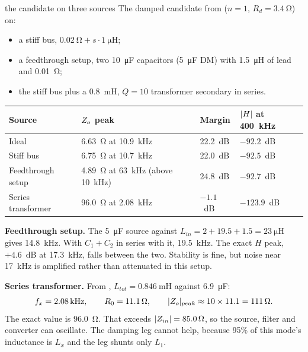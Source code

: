 \begin{examplebox}[label=ex:sources]{the candidate on three sources}
	The damped candidate from  ($n = 1$,
	$R_d = \qty{3.4}{\ohm}$) on:
	\begin{itemize}
		\item a stiff bus, $\qty{0.02}{\ohm} + s\cdot\qty{1}{\micro\henry}$;
		\item a feedthrough setup, two \qty{10}{\micro\farad} capacitors
		      (\qty{5}{\micro\farad} DM) with \qty{1.5}{\micro\henry} of lead
		      and \qty{0.01}{\ohm};
		\item the stiff bus plus a \qty{0.8}{\milli\henry}, $Q = 10$ transformer
		      secondary in series.
	\end{itemize}

	\begin{center}
		\small
		\begin{tabular}{@{}llll@{}}
			\toprule
			Source              & $Z_o$ peak                                    & Margin   & $\lvert H\rvert$ at \qty{400}{\kHz} \\
			\midrule
			Ideal               & \qty{6.63}{\ohm} at \qty{10.9}{\kHz}          & 22.2~dB  & $-92.2$~dB                   \\
			Stiff bus           & \qty{6.75}{\ohm} at \qty{10.7}{\kHz}          & 22.0~dB  & $-92.5$~dB                   \\
			Feedthrough setup   & \qty{4.89}{\ohm} at \qty{63}{\kHz} (above \qty{10}{\kHz}) & 24.8~dB & $-92.7$~dB    \\
			Series transformer  & \qty{96.0}{\ohm} at \qty{2.08}{\kHz}          & $-1.1$~dB  & $-123.9$~dB                  \\
			\bottomrule
		\end{tabular}
	\end{center}

	\textbf{Feedthrough setup.} The \qty{5}{\micro\farad} source against
	$L_{in} = 2 + 19.5 + 1.5 = \qty{23}{\micro\henry}$ gives \qty{14.8}{\kHz}.
	With $C_1 + C_2$ in series with it, \qty{19.5}{\kHz}. The exact $H$ peak,
	$+4.6$~dB at \qty{17.3}{\kHz}, falls between the two. Stability is fine, but
	noise near \qty{17}{\kHz} is amplified rather than attenuated in this setup.

	\textbf{Series transformer.} From ,
	$L_{tot} = \qty{0.846}{\milli\henry}$ against \qty{6.9}{\micro\farad}:
	\[
		f_x = \qty{2.08}{\kHz}, \qquad R_0 = \qty{11.1}{\ohm}, \qquad
		\abs{\Zo}_{peak} \approx 10 \times 11.1 = \qty{111}{\ohm}.
	\]
	The exact value is \qty{96.0}{\ohm}. That exceeds $\lvert Z_{in}\rvert = \qty{85.0}{\ohm}$,
	so the source, filter and converter can oscillate.
	The damping leg cannot help, because 95\% of this mode's inductance is $L_x$
	and the leg shunts only $L_1$.
\end{examplebox}

